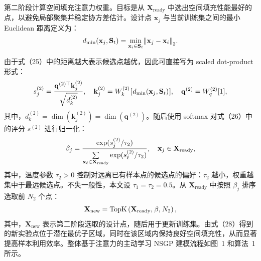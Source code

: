 \documentclass[]{interact}
\theoremstyle{plain}%
\theoremstyle{definition}
\theoremstyle{remark}
\begin{document}
第二阶段计算空间填充注意力权重。目标是从 $\mathbf{X}_{\mathrm{ready}}$ 中选出空间填充性能最好的点，以避免局部聚集并稳定协方差估计。设计点 $\mathbf{x}_{j}$ 与当前训练集之间的最小 Euclidean 距离定义为：
\begin{equation}
	{d_{\min }}({{\bf{x}}_j},{{\bf{S}}_t}) = {\min _{{{\bf{x}}_i} \in {{\bf{S}}_t}}}{\left\| {{{\bf{x}}_j} - {{\bf{x}}_i}} \right\|_2}.
\end{equation}

由于式（25）中的距离越大表示候选点越优，因此可直接写为 scaled dot-product 形式：
\begin{equation}
	s_j^{(2)} = \frac{{{{\bf{q}}^{(2) \top }}{\bf{k}}_j^{(2)}}}{{\sqrt {d_k^{(2)}} }},\quad {\bf{k}}_j^{(2)} = W_k^{(2)}{\mkern 1mu} [{\mkern 1mu} {d_{\min }}({{\bf{x}}_j},{{\bf{S}}_t}){\mkern 1mu} ],\quad {{\bf{q}}^{(2)}} = W_q^{(2)}[1],
\end{equation}
其中，$d_{k}^{(2)} = \dim(\mathbf{k}_{j}^{(2)}) = \dim(\mathbf{q}^{(2)})$。随后使用 softmax 对式（26）中的评分 $s^{(2)}$ 进行归一化：
\begin{equation}
	{\beta _j} = \frac{{\exp (s_j^{(2)}/{\tau _2})}}{{\sum\limits_{{{\bf{x}}_\ell } \in {{\bf{X}}_{{\rm{ready}}}}} {\exp } (s_\ell ^{(2)}/{\tau _2})}},\quad {{\bf{x}}_j} \in {{\bf{X}}_{{\rm{ready}}}},
\end{equation}
其中，温度参数 $\tau_{2} > 0$ 控制对远离已有样本点的候选点的偏好：$\tau_{2}$ 越小，权重越集中于最远候选点。不失一般性，本文设 $\tau_{1} = \tau_{2} = 0.5$。从 $\mathbf{X}_{\mathrm{ready}}$ 中按照 $\beta_{j}$ 排序选取前 $N_{2}$ 个点：
\begin{equation}
	{{\bf{X}}_{{\rm{new}}}} = {\rm{TopK}}\left( {{{\bf{X}}_{{\rm{ready}}}},{\mkern 1mu} \beta ,{\mkern 1mu} {N_2}} \right),
\end{equation}
其中，$\mathbf{X}_{\mathrm{new}}$ 表示第二阶段选取的设计点，随后用于更新训练集。由式（28）得到的新实验点位于潜在最优子区域，同时在该区域内保持良好空间填充性，从而显著提高样本利用效率。整体基于注意力的主动学习 NSGP 建模流程如图~1 和算法~1 所示。
\end{document}
